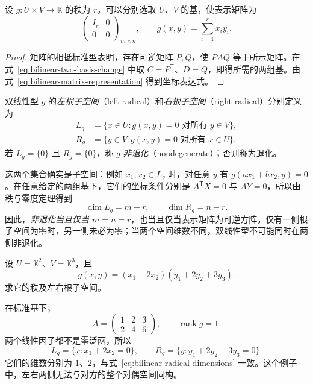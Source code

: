 \begin{theorem}
\label{thm:bilinear-rank-normal-form}
设 $g:U\times V\to\mathbb K$ 的秩为 $r$。可以分别选取 $U$、$V$ 的基，使表示矩阵为
\[
    \begin{pmatrix}I_r&0\\0&0\end{pmatrix}_{m\times n},
    \qquad g(x,y)=\sum_{i=1}^r x_i y_i.
\]
\end{theorem}

\begin{proof}
矩阵的相抵标准型表明，存在可逆矩阵 $P,Q$，使 $PAQ$ 等于所示矩阵。在式~\eqref{eq:bilinear-two-basis-change} 中取 $C=P^{\mathsf T}$、$D=Q$，即得所需的两组基。由式~\eqref{eq:bilinear-matrix-representation} 得到坐标表达式。
\end{proof}

\begin{definition}
\label{def:bilinear-radicals}
双线性型 $g$ 的\emph{左根子空间}（left radical）和\emph{右根子空间}（right radical）分别定义为
\[
\begin{aligned}
    L_g&=\{x\in U:g(x,y)=0\text{ 对所有 }y\in V\},\\
    R_g&=\{y\in V:g(x,y)=0\text{ 对所有 }x\in U\}.
\end{aligned}
\]
若 $L_g=\{0\}$ 且 $R_g=\{0\}$，称 $g$ \emph{非退化}（nondegenerate）；否则称为退化。
\end{definition}

这两个集合确实是子空间：例如 $x_1,x_2\in L_g$ 时，对任意 $y$ 有 $g(ax_1+bx_2,y)=0$。在任意给定的两组基下，它们的坐标条件分别是 $A^{\mathsf T}X=0$ 与 $AY=0$，所以由秩与零度定理得到
\begin{equation}
\label{eq:bilinear-radical-dimensions}
    \dim L_g=m-r,\qquad \dim R_g=n-r.
\end{equation}
因此，\emph{非退化当且仅当 $m=n=r$}，也当且仅当表示矩阵为可逆方阵。仅有一侧根子空间为零时，另一侧未必为零；当两个空间维数不同，双线性型不可能同时在两侧非退化。

\begin{example}
\label{ex:bilinear-rank-one}
设 $U=\mathbb K^2$、$V=\mathbb K^3$，且
\[
    g(x,y)=(x_1+2x_2)(y_1+2y_2+3y_3).
\]
求它的秩及左右根子空间。
\end{example}

\begin{solve}
在标准基下，
\[
    A=\begin{pmatrix}1&2&3\\2&4&6\end{pmatrix},\qquad
    \operatorname{rank}g=1.
\]
两个线性因子都不是零泛函，所以
\[
    L_g=\{x:x_1+2x_2=0\},\qquad
    R_g=\{y:y_1+2y_2+3y_3=0\}.
\]
它们的维数分别为 $1$、$2$，与式~\eqref{eq:bilinear-radical-dimensions} 一致。这个例子中，左右两侧无法与对方的整个对偶空间同构。
\end{solve}

